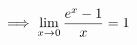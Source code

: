 \documentclass[preview]{standalone}
\begin{document}
\begin{align*}
\special{dvisvgm:raw <g id='unique000'>}\implies \lim_{x \rightarrow 0} \frac{e^x - 1}{x} = 1\special{dvisvgm:raw </g>}
\end{align*}
\end{document}
